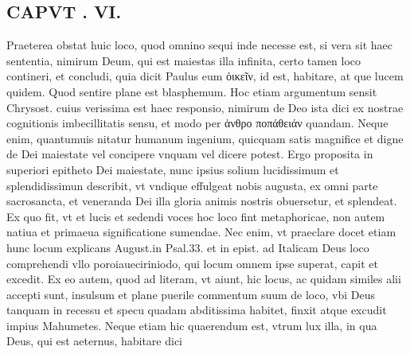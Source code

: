 \documentclass{article}
\begin{document}
\begin{pages}
\section*{CAPVT . VI. }
\marginpar{[ p.487 ]}\pstart Praeterea obstat huic loco, quod omnino sequi inde necesse est, si vera sit haec sententia, nimirum Deum, qui est maiestas illa infinita, certo tamen loco contineri, et concludi, quia dicit Paulus eum ὀικεῖν, id est, habitare, at que lucem quidem. Quod sentire plane est blasphemum. Hoc etiam argumentum sensit Chrysost. cuius verissima est haec responsio, nimirum de Deo ista dici ex nostrae cognitionis imbecillitatis sensu, et modo per ἀνθρο ποπάθειάν quandam. Neque enim, quantumuis nitatur humanum ingenium, quicquam satis magnifice et digne de Dei maiestate vel concipere vnquam vel dicere potest. Ergo proposita in superiori epitheto Dei maiestate, nunc ipsius solium lucidissimum et splendidissimun describit, vt vndique effulgeat nobis augusta, ex omni parte sacrosancta, et veneranda Dei illa gloria animis nostris obuersetur, et splendeat. Ex quo fit, vt et lucis et sedendi voces hoc loco fint metaphoricae, non autem natiua et primaeua significatione sumendae. Nec enim, vt praeclare docet etiam hunc locum explicans August.in Psal.33. et in epist. ad Italicam Deus loco comprehendi vllo poroiaueciriniodo, qui locum omnem ipse superat, capit et excedit. Ex eo autem, quod ad literam, vt aiunt, hic locus, ac quidam similes alii accepti sunt, insulsum et plane puerile commentum suum de loco, vbi Deus tanquam in recessu et specu quadam abditissima habitet, finxit atque  excudit impius Mahumetes.  \pend\pstart Neque etiam hic quaerendum est, vtrum lux illa, in qua Deus, qui est aeternus, habitare dici\pend

\end{pages}
\end{document}
